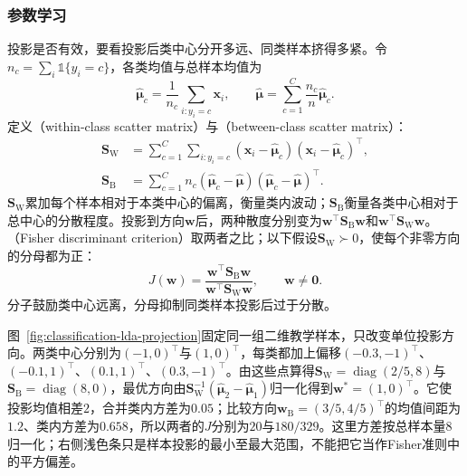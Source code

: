 \subsubsection{参数学习}
\label{sec:classification-fisher-learning}

投影是否有效，要看投影后类中心分开多远、同类样本挤得多紧。令$n_c=\sum_i\mathbb{1}\{y_i=c\}$，各类均值与总样本均值为
\[
  \hat{\bm{\mu}}_c=\frac1{n_c}\sum_{i:y_i=c}\bm{x}_i,\qquad
  \hat{\bm{\mu}}=\sum_{c=1}^{C}\frac{n_c}{n}\hat{\bm{\mu}}_c.
\]
定义（within-class scatter matrix）与（between-class scatter matrix）：
\begin{equation}
  \begin{aligned}
    \bm{S}_{\mathrm{W}}
      &=\sum_{c=1}^{C}\sum_{i:y_i=c}
        (\bm{x}_i-\hat{\bm{\mu}}_c)
        (\bm{x}_i-\hat{\bm{\mu}}_c)^{\top},\\
    \bm{S}_{\mathrm{B}}
      &=\sum_{c=1}^{C}n_c
        (\hat{\bm{\mu}}_c-\hat{\bm{\mu}})
        (\hat{\bm{\mu}}_c-\hat{\bm{\mu}})^{\top}.
  \end{aligned}
  \label{eq:classification-fisher-scatter}
\end{equation}
$\bm{S}_{\mathrm{W}}$累加每个样本相对于本类中心的偏离，衡量类内波动；$\bm{S}_{\mathrm{B}}$衡量各类中心相对于总中心的分散程度。投影到方向$\bm{w}$后，两种散度分别变为$\bm{w}^{\top}\bm{S}_{\mathrm{B}}\bm{w}$和$\bm{w}^{\top}\bm{S}_{\mathrm{W}}\bm{w}$。（Fisher discriminant criterion）取两者之比；以下假设$\bm{S}_{\mathrm{W}}\succ0$，使每个非零方向的分母都为正：
\begin{equation}
  J(\bm{w})
    =\frac{\bm{w}^{\top}\bm{S}_{\mathrm{B}}\bm{w}}
          {\bm{w}^{\top}\bm{S}_{\mathrm{W}}\bm{w}},
  \qquad \bm{w}\ne\bm{0}.
  \label{eq:classification-fisher-criterion}
\end{equation}
分子鼓励类中心远离，分母抑制同类样本投影后过于分散。

图~\ref{fig:classification-lda-projection}固定同一组二维教学样本，只改变单位投影方向。两类中心分别为$(-1,0)^{\top}$与$(1,0)^{\top}$，每类都加上偏移$(-0.3,-1)^{\top}$、$(-0.1,1)^{\top}$、$(0.1,1)^{\top}$、$(0.3,-1)^{\top}$。由这些点算得$\bm{S}_{\mathrm{W}}=\operatorname{diag}(2/5,8)$与$\bm{S}_{\mathrm{B}}=\operatorname{diag}(8,0)$，最优方向由$\bm{S}_{\mathrm{W}}^{-1}(\hat{\bm\mu}_2-\hat{\bm\mu}_1)$归一化得到$\bm w^\ast=(1,0)^{\top}$。它使投影均值相差$2$，合并类内方差为$0.05$；比较方向$\bm w_{\mathrm B}=(3/5,4/5)^{\top}$的均值间距为$1.2$、类内方差为$0.658$，所以两者的$J$分别为$20$与$180/329$。这里方差按总样本量$8$归一化；右侧浅色条只是样本投影的最小至最大范围，不能把它当作Fisher准则中的平方偏差。

